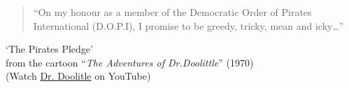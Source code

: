 {
\begin{frame}
\medskip
\begin{quotation}
	``On my honour as a member of the Democratic Order of Pirates International (D.O.P.I), I promise to be greedy, tricky, mean and icky\ldots''
\end{quotation}
\begin{flushright}
	`The Pirates Pledge'\\\small from the cartoon ``\textit{The Adventures of Dr.Doolittle}'' (1970) \\[5pt]
	\tiny (Watch \href{https://youtu.be/SQtMMYGTNz8}{Dr. Doolitle} on YouTube)
\end{flushright}



\end{frame}
}

